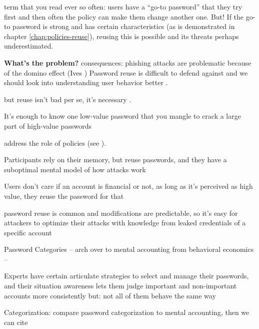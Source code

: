	term that you read ever so often: users have a ``go-to password'' that they try first
	and then often the policy can make them change another one. But! If the go-to password is strong and has certain characteristics (as is demonstrated in chapter \ref{chap:policies-reuse}), reusing this is possible and its threats perhaps underestimated. 
	
	\textbf{What's the problem?}
	consequences: phishing attacks are problematic because of the domino effect (Ives \etal) Password reuse is difficult to defend against and we should look into understanding user behavior better \cite{Ives2004DominoEffectReuse}.
	
	but reuse isn't bad per se, it's necessary \cite{Florencio2014PasswordPortfoliosFiniteUser, ZhangKennedy2016RevisitingPasswordRules}. 
	

	
	
	It's enough to know one low-value password that you mangle to crack a large part of high-value passwords \cite{Haque2014Hierarchy}
	
	
	address the role of policies (see \cite{Seitz2017PoliciesReuse}).
	
	Participants rely on their memory, but reuse passwords, and they have a suboptimal mental model of how attacks work \cite{Gaw2006PasswordManagement}
	
	Users don't care if an account is financial or not, as long as it's perceived as high value, they reuse the password for that \cite{Bailey2014StatisticsReuse}
	
	password reuse is common and modifications are predictable, so it's easy for attackers to optimize their attacks with knowledge from leaked credentials of a specific account \cite{Das2014TangledWeb}

	Password Categories -- arch over to mental accounting from behavioral economics -- \cite{Thaler2004}
	
	Experts have certain articulate strategies to select and manage their passwords, and their situation awareness lets them judge important and non-important accounts more consistently  	\cite{Stobert2015ExpertPassword} 
	but: not all of them behave the same way \cite{Loutfi2015PasswordsOtherSideOfTheFence}

	Categorization: 
	compare password categorization to mental accounting, then we can cite \cite{Stockinger2015TowardsBE}
	
